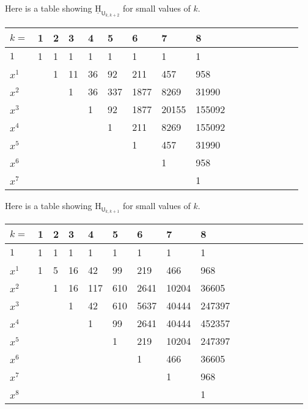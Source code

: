 \documentclass[11pt, a4paper, english]{amsart}
\theoremstyle{teoremas}
\theoremstyle{definition}
\newcommand{\U}{\mathsf{U}}
\renewcommand{\H}{\mathrm{H}}
\newcommand{\uH}{\underline{\mathrm{H}}}
\begin{document}
Here is a table showing $\uH_{\U_{k,k+2}}$ for small values of $k$.

\begin{center}
\begin{tabular}{l l l l l l l l l l l l l l l l}\hline
$k=$      & 1   & 2 & 3 & 4 & 5 & 6 & 7 & 8\\ \hline
$1$  & 1 & 1 & 1 & 1 & 1 & 1 & 1 & 1\\
$x^1$  &  & 1 & 11 & 36 & 92 & 211 & 457 & 958\\
$x^2$  &  &  & 1 & 36 & 337 & 1877 & 8269 & 31990\\
$x^3$  &  &  &  & 1 & 92 & 1877 & 20155 & 155092\\
$x^4$  &  &  &  &  & 1 & 211 & 8269 & 155092\\
$x^5$  &  &  &  &  &  & 1 & 457 & 31990\\
$x^6$  &  &  &  &  &  &  & 1 & 958\\
$x^7$  &  &  &  &  &  &  &  & 1\\
\end{tabular}
\end{center}

Here is a table showing $\H_{\U_{k,k+1}}$ for small values of $k$.

\begin{center}
\begin{tabular}{l l l l l l l l l l l l l l l l}\hline
$k=$      & 1   & 2 & 3 & 4 & 5 & 6 & 7 & 8  \\ \hline
$1$  & 1 & 1 & 1 & 1 & 1 & 1 & 1 & 1\\
$x^1$  & 1 & 5 & 16 & 42 & 99 & 219 & 466 & 968\\
$x^2$  &  & 1 & 16 & 117 & 610 & 2641 & 10204 & 36605\\
$x^3$  &  &  & 1 & 42 & 610 & 5637 & 40444 & 247397\\
$x^4$  &  &  &  & 1 & 99 & 2641 & 40444 & 452357\\
$x^5$  &  &  &  &  & 1 & 219 & 10204 & 247397\\
$x^6$  &  &  &  &  &  & 1 & 466 & 36605\\
$x^7$  &  &  &  &  &  &  & 1 & 968\\
$x^8$  &  &  &  &  &  &  &  & 1\\
\end{tabular}
\end{center}

\fi
\end{document}
